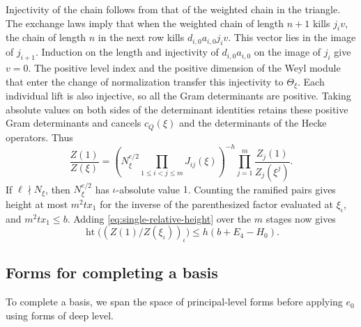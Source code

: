 Injectivity of the chain follows from that of the weighted chain in the
triangle. The exchange laws imply that when the weighted chain of length
\(n+1\) kills \(j_i v\), the chain of length \(n\) in the next row kills
\(d_{i,0}a_{i,0}j_i v\). This vector lies in the image of \(j_{i+1}\).
Induction on the length and injectivity of \(d_{i,0}a_{i,0}\) on the
image of \(j_i\) give \(v=0\). The positive level index and the positive
dimension of the Weyl module that enter the change of normalization
transfer this injectivity to \(\Theta_\xi\). Each individual lift is
also injective, so all the Gram determinants are positive. Taking
absolute values on both sides of the determinant identities retains
these positive Gram determinants and cancels \(c_Q(\xi)\) and the
determinants of the Hecke operators. Thus
\begin{equation}
 \frac{Z(1)}{Z(\xi)}
 =
 \left(N_\xi^{e/2}\prod_{1\le i<j\le m}J_{ij}(\xi)\right)^{-h}
       \prod_{j=1}^m\frac{Z_j(1)}{Z_j(\xi^j)}.
 \label{eq:chain-relative-factorization}
\end{equation}
If \(\ell\nmid N_\xi\), then \(N_\xi^{e/2}\) has \(\iota\)-absolute value
\(1\). Counting the ramified pairs gives height at most \(m^2t x_1\) for
the inverse of the parenthesized factor evaluated at \(\xi_\iota\), and
\(m^2t x_1\le b\). Adding \eqref{eq:single-relative-height} over the
\(m\) stages now gives
\begin{equation}
 \operatorname{ht}\bigl((Z(1)/Z(\xi_\iota))_\iota\bigr)
       \le h(b+E_4-H_0).
 \label{eq:chain-relative-height}
\end{equation}

\subsection{Forms for completing a basis}

To complete a basis, we span the space of principal-level forms before
applying \(e_0\) using forms of deep level.


